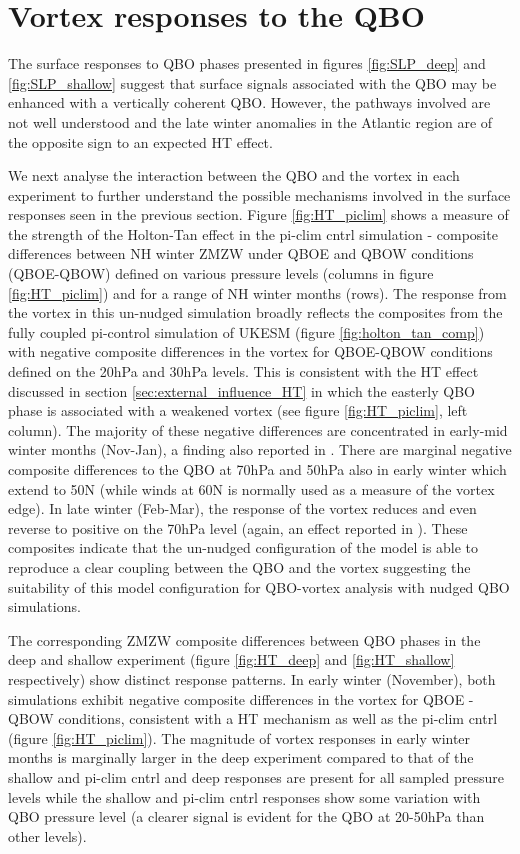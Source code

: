 \section{Vortex responses to the QBO}
\label{sec:vortex_responses_QBO}
The surface responses to QBO phases presented in figures \ref{fig:SLP_deep} and \ref{fig:SLP_shallow} suggest that surface signals associated with the QBO may be enhanced with a vertically coherent QBO. However, the pathways involved are not well understood and the late winter anomalies in the Atlantic region are of the opposite sign to an expected HT effect.

We next analyse the interaction between the QBO and the vortex in each experiment to further understand the possible mechanisms involved in the surface responses seen in the previous section. Figure \ref{fig:HT_piclim} shows a measure of the strength of the Holton-Tan effect in the pi-clim cntrl simulation -  composite differences between NH winter ZMZW under QBOE and QBOW conditions (QBOE-QBOW) defined on various pressure levels (columns in figure \ref{fig:HT_piclim}) and for a range of NH winter months (rows). The response from the vortex in this un-nudged simulation broadly reflects the composites from the fully coupled pi-control simulation of UKESM (figure \ref{fig:holton_tan_comp}) with negative composite differences in the vortex for QBOE-QBOW conditions defined on the 20hPa and 30hPa levels. This is consistent with the HT effect discussed in section \ref{sec:external_influence_HT} in which the easterly QBO phase is associated with a weakened vortex (see figure \ref{fig:HT_piclim}, left column). The majority of these negative differences are concentrated in early-mid winter months (Nov-Jan), a finding also reported in \cite{graySurface2018b}. There are marginal negative composite differences to the QBO at 70hPa and 50hPa also in early winter which extend to 50N (while winds at 60N is normally used as a measure of the vortex edge). In late winter (Feb-Mar), the response of the vortex reduces and even reverse to positive on the 70hPa level (again, an effect reported in \cite{graySurface2018b}). These composites indicate that the un-nudged configuration of the model is able to reproduce a clear coupling between the QBO and the vortex suggesting the suitability of this model configuration for QBO-vortex analysis with nudged QBO simulations.

The corresponding ZMZW composite differences between QBO phases in the deep and shallow experiment (figure \ref{fig:HT_deep} and \ref{fig:HT_shallow} respectively) show distinct response patterns. In early winter (November), both simulations exhibit negative composite differences in the vortex for QBOE - QBOW conditions, consistent with a HT mechanism \citep{HoltonJamesRTan1980} as well as the pi-clim cntrl (figure \ref{fig:HT_piclim}). The magnitude of vortex responses in early winter months is marginally larger in the deep experiment compared to that of the shallow and pi-clim cntrl and deep responses are present for all sampled pressure levels while the shallow and pi-clim cntrl responses show some variation with QBO pressure level (a clearer signal is evident for the QBO at 20-50hPa than other levels). 

